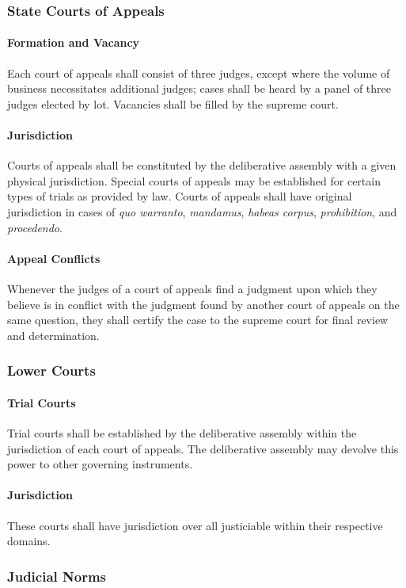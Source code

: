 \documentclass{article}
\begin{document}
\subsubsection{State Courts of Appeals}
\paragraph{Formation and Vacancy}
Each court of appeals shall consist of three judges, except where the volume of business necessitates additional judges; cases shall be heard by a panel of three judges elected by lot. Vacancies shall be filled by the supreme court.
\paragraph{Jurisdiction}
Courts of appeals shall be constituted by the deliberative assembly with a given physical jurisdiction. Special courts of appeals may be established for certain types of trials as provided by law. Courts of appeals shall have original jurisdiction in cases of \textit{quo warranto}, \textit{mandamus}, \textit{habeas corpus}, \textit{prohibition}, and \textit{procedendo}.
\paragraph{Appeal Conflicts}
Whenever the judges of a court of appeals find a judgment upon which they believe is in conflict with the judgment found by another court of appeals on the same question, they shall certify the case to the supreme court for final review and determination. 
\subsubsection{Lower Courts}
\paragraph{Trial Courts}
Trial courts shall be established by the deliberative assembly within the jurisdiction of each court of appeals. The deliberative assembly may devolve this power to other governing instruments.
\paragraph{Jurisdiction}
These courts shall have jurisdiction over all justiciable within their respective domains.
\subsubsection{Judicial Norms}
\end{document}
